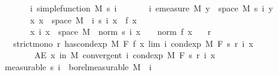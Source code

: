 \begin{isabellebody}
\ \ \ \ \ \ \ {\isachardoublequoteopen}{\isasymAnd}i{\isachardot}{\kern0pt}\ simple{\isacharunderscore}{\kern0pt}function\ M\ {\isacharparenleft}{\kern0pt}s\ i{\isacharparenright}{\kern0pt}{\isachardoublequoteclose}\isanewline
\ \ \ \ \ \ \ {\isachardoublequoteopen}{\isasymAnd}i{\isachardot}{\kern0pt}\ emeasure\ M\ {\isacharbraceleft}{\kern0pt}y\ {\isasymin}\ space\ M{\isachardot}{\kern0pt}\ s\ i\ y\ {\isasymnoteq}\ {}{\isacharbraceright}{\kern0pt}\ {\isasymnoteq}\ {\isasyminfinity}{\isachardoublequoteclose}\isanewline
\ \ \ \ \ \ \ {\isachardoublequoteopen}{\isasymAnd}x{\isachardot}{\kern0pt}\ x\ {\isasymin}\ space\ M\ {\isasymLongrightarrow}\ {\isacharparenleft}{\kern0pt}{\isasymlambda}i{\isachardot}{\kern0pt}\ s\ i\ x{\isacharparenright}{\kern0pt}\ {\isasymlonglonglongrightarrow}\ f\ x{\isachardoublequoteclose}\isanewline
\ \ \ \ \ \ \ {\isachardoublequoteopen}{\isasymAnd}x\ i{\isachardot}{\kern0pt}\ x\ {\isasymin}\ space\ M\ {\isasymLongrightarrow}\ norm\ {\isacharparenleft}{\kern0pt}s\ i\ x{\isacharparenright}{\kern0pt}\ {\isasymle}\ {}\ {\isacharasterisk}{\kern0pt}\ norm\ {\isacharparenleft}{\kern0pt}f\ x{\isacharparenright}{\kern0pt}{\isachardoublequoteclose}\isanewline
\ \ \ r\ \isanewline
\ \ \ {\isachardoublequoteopen}strict{\isacharunderscore}{\kern0pt}mono\ r{\isachardoublequoteclose}\ {\isachardoublequoteopen}has{\isacharunderscore}{\kern0pt}cond{\isacharunderscore}{\kern0pt}exp\ M\ F\ f\ {\isacharparenleft}{\kern0pt}{\isasymlambda}x{\isachardot}{\kern0pt}\ lim\ {\isacharparenleft}{\kern0pt}{\isasymlambda}i{\isachardot}{\kern0pt}\ cond{\isacharunderscore}{\kern0pt}exp\ M\ F\ {\isacharparenleft}{\kern0pt}s\ {\isacharparenleft}{\kern0pt}r\ i{\isacharparenright}{\kern0pt}{\isacharparenright}{\kern0pt}\ x{\isacharparenright}{\kern0pt}{\isacharparenright}{\kern0pt}{\isachardoublequoteclose}\ \isanewline
\ \ \ \ \ \ \ \ {\isachardoublequoteopen}AE\ x\ in\ M{\isachardot}{\kern0pt}\ convergent\ {\isacharparenleft}{\kern0pt}{\isasymlambda}i{\isachardot}{\kern0pt}\ cond{\isacharunderscore}{\kern0pt}exp\ M\ F\ {\isacharparenleft}{\kern0pt}s\ {\isacharparenleft}{\kern0pt}r\ i{\isacharparenright}{\kern0pt}{\isacharparenright}{\kern0pt}\ x{\isacharparenright}{\kern0pt}{\isachardoublequoteclose}\isanewline
%
\isadelimproof
%
\endisadelimproof
%
\isatagproof
{}\isamarkupfalse%
\ {\isacharminus}{\kern0pt}\isanewline
\ \ \isamarkupfalse%
\ {\isacharbrackleft}{\kern0pt}measurable{\isacharbrackright}{\kern0pt}{\isacharcolon}{\kern0pt}\ {\isachardoublequoteopen}{\isacharparenleft}{\kern0pt}s\ i{\isacharparenright}{\kern0pt}\ {\isasymin}\ borel{\isacharunderscore}{\kern0pt}measurable\ M{\isachardoublequoteclose}\ \ i\ \isamarkupfalse%

\end{isabellebody}
